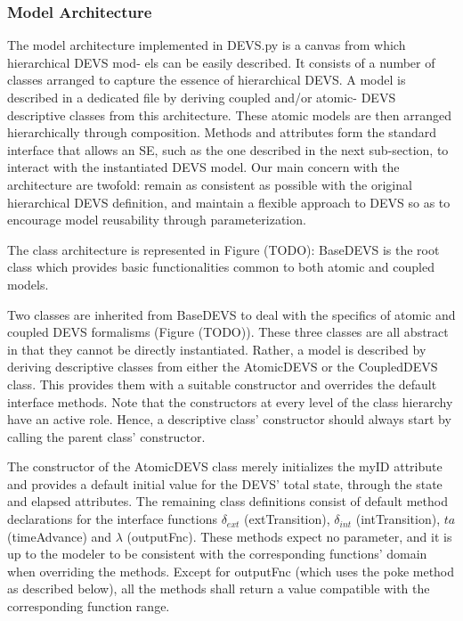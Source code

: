 \subsubsection{Model Architecture}
The model architecture implemented in DEVS.py is a canvas from which hierarchical DEVS mod- els can be easily described. It consists 
of a number of classes arranged to capture the essence of hierarchical DEVS. A model is described in a dedicated file by deriving 
coupled and/or atomic- DEVS descriptive classes from this architecture. These atomic models are then arranged hierarchically through 
composition. Methods and attributes form the standard interface that allows an SE, such as the one described in the next sub-section, 
to interact with the instantiated DEVS model. Our main concern with the architecture are twofold: remain as consistent as possible 
with the original hierarchical DEVS definition, and maintain a flexible approach to DEVS so as to encourage model reusability 
through parameterization.

The class architecture is represented in Figure (TODO): BaseDEVS is the root class which provides basic functionalities common to both 
atomic and coupled models.

Two classes are inherited from BaseDEVS to deal with the specifics of atomic and coupled DEVS formalisms (Figure (TODO)). These three 
classes are all abstract in that they cannot be directly instantiated. Rather, a model is described by deriving descriptive classes 
from either the AtomicDEVS or the CoupledDEVS class. This provides them with a suitable constructor and overrides the default 
interface methods. Note that the constructors at every level of the class hierarchy have an active role. Hence, a descriptive class' 
constructor should always start by calling the parent class' constructor.

The constructor of the AtomicDEVS class merely initializes the myID attribute and provides a default initial value for the DEVS' 
total state, through the state and elapsed attributes. The remaining class definitions consist of default method declarations for 
the interface functions $\delta_{ext}$ (extTransition), $\delta_{int}$ (intTransition), $ta$ (timeAdvance) and $\lambda$ (outputFnc). 
These methods expect no parameter, and it is up to the modeler to be consistent with the corresponding functions' domain when overriding 
the methods. Except for outputFnc (which uses the poke method as described below), all the methods shall return a value compatible with 
the corresponding function range.

